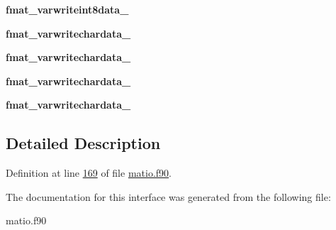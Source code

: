 \begin{DoxyCompactItemize}
{\bfseries fmat\+\_\+varwriteint8data\+\_}
\item 
\mbox{\label{interfacematio_1_1fmat__varwritedata_aec6f32df8cc3c8769056afeeca3baeb5}} 
{\bfseries fmat\+\_\+varwritechardata\+\_}
\item 
\mbox{\label{interfacematio_1_1fmat__varwritedata_a12bbdd2e8ff6efbc74bd50278a183ec7}} 
{\bfseries fmat\+\_\+varwritechardata\+\_}
\item 
\mbox{\label{interfacematio_1_1fmat__varwritedata_a3d92a81c709fc849d2fd296a0dd57823}} 
{\bfseries fmat\+\_\+varwritechardata\+\_}
\item 
\mbox{\label{interfacematio_1_1fmat__varwritedata_a7f412086475f7ac76c50f6df316c593c}} 
{\bfseries fmat\+\_\+varwritechardata\+\_}
\end{DoxyCompactItemize}


\subsection{Detailed Description}


Definition at line \hyperlink{matio_8f90_source_l00169}{169} of file \hyperlink{matio_8f90_source}{matio.\+f90}.



The documentation for this interface was generated from the following file\+:\begin{DoxyCompactItemize}
\item 
matio.\+f90\end{DoxyCompactItemize}
